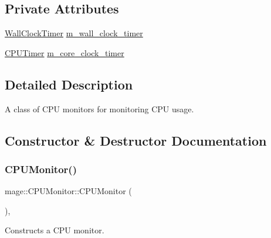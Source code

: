 \subsection*{Private Attributes}
\begin{DoxyCompactItemize}
\item 
\hyperlink{namespacemage_a06f4035ef59f07892e594bf1178a108a}{Wall\+Clock\+Timer} \hyperlink{classmage_1_1_c_p_u_monitor_ac1e3d7a7271515873a7a82a25eca4da2}{m\+\_\+wall\+\_\+clock\+\_\+timer}
\item 
\hyperlink{namespacemage_a1032d81f22079b7190cac3bf14136068}{C\+P\+U\+Timer} \hyperlink{classmage_1_1_c_p_u_monitor_a245b920ef7e6703087b47ad370cb3bbb}{m\+\_\+core\+\_\+clock\+\_\+timer}
\end{DoxyCompactItemize}


\subsection{Detailed Description}
A class of C\+PU monitors for monitoring C\+PU usage. 

\subsection{Constructor \& Destructor Documentation}
\hypertarget{classmage_1_1_c_p_u_monitor_ad41542b831ae42cf8dbb206a70535598}{}\label{classmage_1_1_c_p_u_monitor_ad41542b831ae42cf8dbb206a70535598} 
\subsubsection{\texorpdfstring{C\+P\+U\+Monitor()}{CPUMonitor()}\hspace{0.1cm}{\footnotesize\ttfamily [1/3]}}
{\footnotesize\ttfamily mage\+::\+C\+P\+U\+Monitor\+::\+C\+P\+U\+Monitor (\begin{DoxyParamCaption}{ }\end{DoxyParamCaption})\hspace{0.3cm}{\ttfamily [default]}, {\ttfamily [noexcept]}}

Constructs a C\+PU monitor. \hypertarget{classmage_1_1_c_p_u_monitor_a8d53a4b373c63d074fcb0cb969b3f7cb}{}\label{classmage_1_1_c_p_u_monitor_a8d53a4b373c63d074fcb0cb969b3f7cb} 
